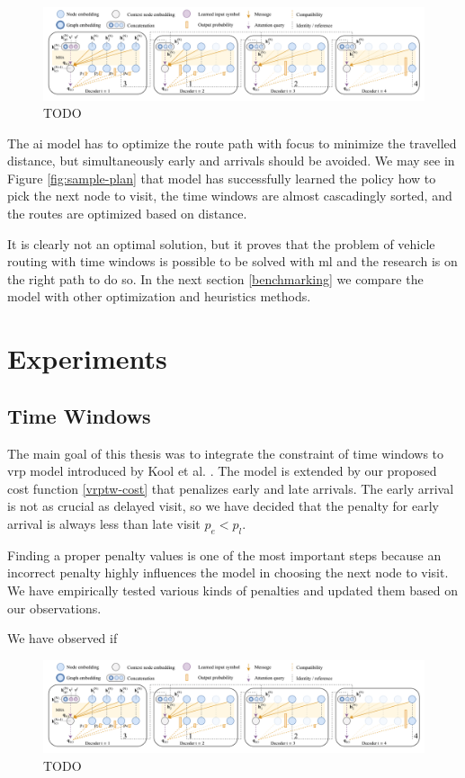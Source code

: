 \begin{figure}[ht]
    \centering
    \includegraphics[width=1.0\textwidth]{resources/vrptw-ai/decoder-diagram.png}
    \caption{TODO \cite{attention-route}}
    \label{fig:encoder-diagram}
\end{figure}

The \gls{ai} model has to optimize the route path with focus to minimize the travelled distance, but simultaneously early and arrivals should be avoided. We may see in Figure \ref{fig:sample-plan} that model has successfully learned the policy how to pick the next node to visit, the time windows are almost cascadingly sorted, and the routes are optimized based on distance. 

It is clearly not an optimal solution, but it proves that the problem of vehicle routing with time windows is  possible to be solved with \gls{ml} and the research is on the right path to do so. In the next section \ref{benchmarking} we compare the model with other optimization and heuristics methods.

\section{Experiments}
\subsection{Time Windows}
The main goal of this thesis was to integrate the constraint of time windows to \gls{vrp} model introduced by Kool et al. \cite{attention-route}. The model is extended by our proposed cost function \ref{vrptw-cost} that penalizes early and late arrivals. The early arrival is not as crucial as delayed visit, so we have decided that the penalty for early arrival is always less than late visit $p_e < p_l$.

Finding a proper penalty values is one of the most important steps because an incorrect penalty highly influences the model in choosing the next node to visit. We have empirically tested various kinds of penalties
and updated them based on our observations.

We have observed if 
\begin{figure}[ht]
    \centering
    \includegraphics[width=1.0\textwidth]{resources/vrptw-ai/decoder-diagram.png}
    \caption{TODO \cite{attention-route}}
    \label{fig:encoder-diagram}
\end{figure}

